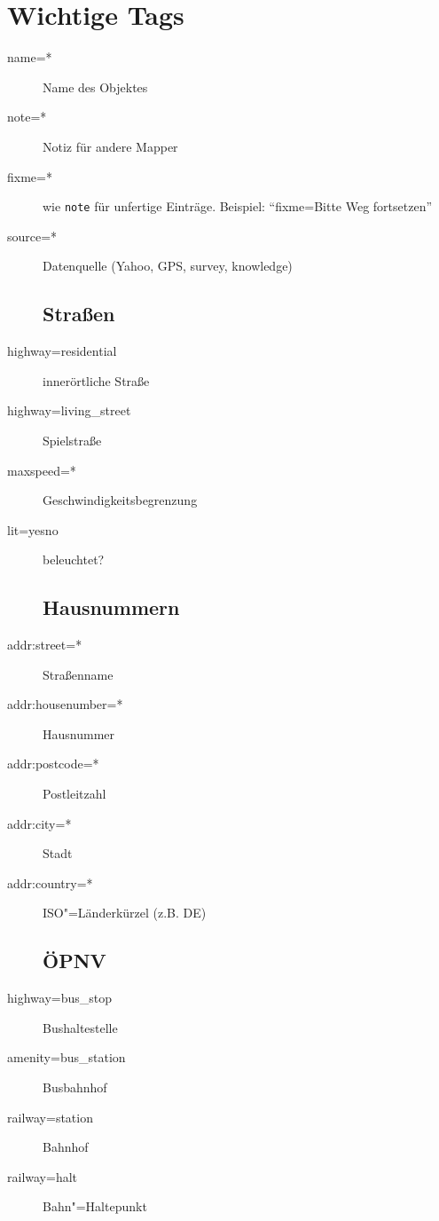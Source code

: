 \documentclass[a4paper,11pt,notumble]{leaflet}
\begin{document}
\section*{Wichtige Tags}
\begin{flushleft}
\begin{description}
\item[name=*] Name des Objektes
\item[note=*] Notiz für andere Mapper
\item[fixme=*] wie \texttt{note} für unfertige Einträge. 
Beispiel: "`fixme=Bitte Weg fortsetzen"'
\item[source=*] Datenquelle (Yahoo, GPS, survey, knowledge)
\subsection*{Straßen}
\item[highway=residential] innerörtliche Straße
\item[highway=living\_street] Spielstraße
\item[maxspeed=*] Geschwindigkeitsbegrenzung 
\item[lit=yes\textbar no] beleuchtet?
\subsection*{Hausnummern}
\item[addr:street=*] Straßenname
\item[addr:housenumber=*] Hausnummer 
\item[addr:postcode=*] Postleitzahl
\item[addr:city=*] Stadt
\item[addr:country=*] ISO"=Länderkürzel (z.B. DE)
\subsection*{ÖPNV}
\item[highway=bus\_stop] Bushaltestelle
\item[amenity=bus\_station] Busbahnhof
\item[railway=station] Bahnhof
\item[railway=halt] Bahn"=Haltepunkt

\end{description}
\end{flushleft}
\end{document}
